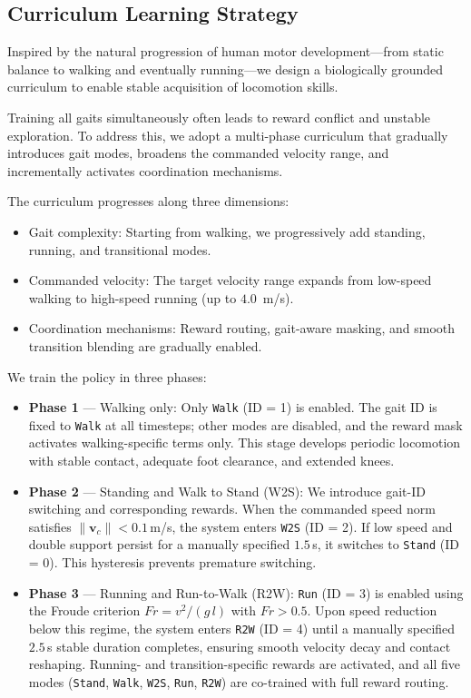 \documentclass[letterpaper, 10 pt, conference]{ieeeconf}
\begin{document}
\subsection{Curriculum Learning Strategy}

Inspired by the natural progression of human motor development—from static balance to walking and eventually running—we design a biologically grounded curriculum to enable stable acquisition of locomotion skills.

Training all gaits simultaneously often leads to reward conflict and unstable exploration. To address this, we adopt a multi-phase curriculum that gradually introduces gait modes, broadens the commanded velocity range, and incrementally activates coordination mechanisms.

The curriculum progresses along three dimensions:
\begin{itemize}
\item Gait complexity: Starting from walking, we progressively add standing, running, and transitional modes.
\item Commanded velocity: The target velocity range expands from low-speed walking to high-speed running (up to $4.0$~m/s).
\item Coordination mechanisms: Reward routing, gait-aware masking, and smooth transition blending are gradually enabled.
\end{itemize}

We train the policy in three phases:

\begin{itemize}
    \item \textbf{Phase 1} --- Walking only: Only \texttt{Walk} (ID = 1) is enabled. The gait ID is fixed to \texttt{Walk} at all timesteps; other modes are disabled, and the reward mask activates walking-specific terms only.  This stage develops periodic locomotion with stable contact, adequate foot clearance, and extended knees.

    \item \textbf{Phase 2} --- Standing and Walk to Stand (W2S): We introduce gait-ID switching and corresponding rewards. When the commanded speed norm satisfies $\|\mathbf{v}_c\| < 0.1$\,m/s, the system enters \texttt{W2S} (ID = 2). If low speed and double support persist for a manually specified $1.5$\,s, it switches to \texttt{Stand} (ID = 0). This hysteresis prevents premature switching.

    \item \textbf{Phase 3} --- Running and Run-to-Walk (R2W): \texttt{Run} (ID = 3) is enabled using the Froude criterion $Fr = v^2/(g\,l)$ with $Fr>0.5$. Upon speed reduction below this regime, the system enters \texttt{R2W} (ID = 4) until a manually specified $2.5$\,s stable duration completes, ensuring smooth velocity decay and contact reshaping. Running- and transition-specific rewards are activated, and all five modes (\texttt{Stand}, \texttt{Walk}, \texttt{W2S}, \texttt{Run}, \texttt{R2W}) are co-trained with full reward routing.
\end{itemize}
\end{document}
